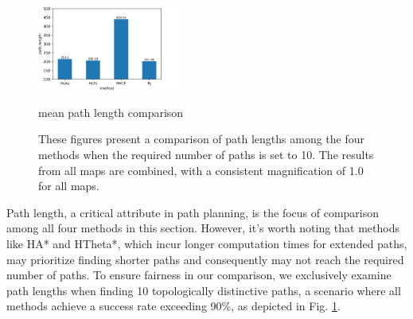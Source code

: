\documentclass[letterpaper, 10 pt, journal, twoside]{IEEEtran}
\begin{document}
\begin{figure}[t] \scriptsize
  \centerline{\includegraphics[width=4.6cm]{method_path_length.png}}
  \centerline{mean path length comparison}
\caption{These figures present a comparison of path lengths among the four methods when the required number of paths is set to 10. The results from all maps are combined, with a consistent magnification of 1.0 for all maps. }
\label{compariosn_path_length}
\end{figure}



Path length, a critical attribute in path planning, is the focus of comparison among all four methods in this section. However, it's worth noting that methods like HA* and HTheta*, which incur longer computation times for extended paths, may prioritize finding shorter paths and consequently may not reach the required number of paths. To ensure fairness in our comparison, we exclusively examine path lengths when finding 10 topologically distinctive paths, a scenario where all methods achieve a success rate exceeding 90\%, as depicted in Fig. \ref{compariosn_path_length}.
\end{document}
